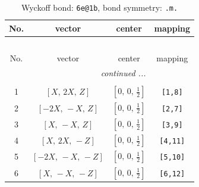 \documentclass[fleqn,8pt]{jsarticle}
\begin{document}
\renewcommand{\arraystretch}{1.2}
\begin{longtable}{cccc}
\caption{Wyckoff bond: {\tt 6e@1b}, bond symmetry: {\tt .m.}}
 \\
 \hline \hline
No. & vector & center & mapping \\ \hline \endfirsthead

\multicolumn{3}{l}{\tablename\ \thetable{}} \\
 \hline \hline
No. & vector & center & mapping \\ \hline \endhead

 \hline \hline
\multicolumn{3}{r}{\footnotesize\it continued ...} \\ \endfoot

 \hline \hline
\multicolumn{3}{r}{} \\ \endlastfoot

1 & $\left[ X,\, 2 X,\, Z \right]$ & $\left[ 0,\, 0,\, \frac{1}{2} \right]$ & {\tt [1,8]} \\ \hline
2 & $\left[ - 2 X,\, - X,\, Z \right]$ & $\left[ 0,\, 0,\, \frac{1}{2} \right]$ & {\tt [2,7]} \\ \hline
3 & $\left[ X,\, - X,\, Z \right]$ & $\left[ 0,\, 0,\, \frac{1}{2} \right]$ & {\tt [3,9]} \\ \hline
4 & $\left[ X,\, 2 X,\, - Z \right]$ & $\left[ 0,\, 0,\, \frac{1}{2} \right]$ & {\tt [4,11]} \\ \hline
5 & $\left[ - 2 X,\, - X,\, - Z \right]$ & $\left[ 0,\, 0,\, \frac{1}{2} \right]$ & {\tt [5,10]} \\ \hline
6 & $\left[ X,\, - X,\, - Z \right]$ & $\left[ 0,\, 0,\, \frac{1}{2} \right]$ & {\tt [6,12]} \\
\end{longtable}
\renewcommand{\arraystretch}{1.2}
\end{document}
